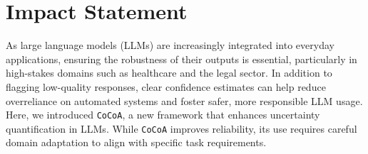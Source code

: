 
\vspace{-2mm}
\section*{Impact Statement}
As large language models (LLMs) are increasingly integrated into everyday applications, ensuring the robustness of their outputs is essential, particularly in high-stakes domains such as healthcare and the legal sector. In addition to flagging low-quality responses, clear confidence estimates can help reduce overreliance on automated systems and foster safer, more responsible LLM usage. Here, we introduced \texttt{CoCoA}, a new framework that enhances uncertainty quantification in LLMs. While \texttt{CoCoA} improves reliability, its use requires careful domain adaptation to align with specific task requirements.
